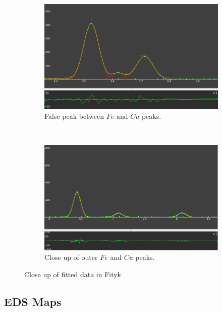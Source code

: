 \documentclass[12pt,a4paper]{article}
\begin{document}
\begin{figure}[htbp]
  \centering
    \begin{subfigure}[b]{0.45\textwidth}
    \includegraphics[width=\textwidth]{Data/crossover.png}
    \caption{False peak between $Fe$ and $Cu$ peaks.}
    \label{fig:cross}
  \end{subfigure}
  ~
  \begin{subfigure}[b]{0.45\textwidth}
    \includegraphics[width=\textwidth]{Data/outer_peak.png}
    \caption{Close up of outer $Fe$ and $Cu$ peaks.}
    \label{fig:outer}
  \end{subfigure}%
  \caption{Close up of fitted data in Fityk}
  \label{fig:fit}
\end{figure}


\subsection{EDS Maps} %
\label{sub:eds_maps}
\end{document}
